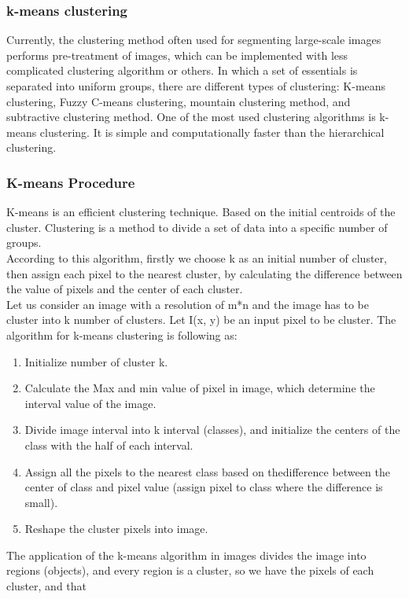 \subsubsection{k-means clustering}
Currently, the clustering method often used for segmenting large-scale images
performs pre-treatment of images, which can be implemented with less complicated
clustering algorithm or others. In which a set of essentials is separated into uniform
groups, there are different types of clustering: K-means clustering, Fuzzy C-means
clustering, mountain clustering method, and subtractive clustering method. One of
the most used clustering algorithms is k-means clustering. It is simple and
computationally faster than the hierarchical clustering.
\subsubsection*{K-means Procedure}
K-means is an efficient clustering technique. Based on the initial centroids of the
cluster. Clustering is a method to divide a set of data into a specific number of
groups.\\
According to this algorithm, firstly we choose k as an initial number of cluster, then
assign each pixel to the nearest cluster, by calculating the difference between the
value of pixels and the center of each cluster.\\
Let us consider an image with a resolution of m*n and the image has to be cluster
into k number of clusters. Let I(x, y) be an input pixel to be cluster. The algorithm for
k-means clustering is following as:
\begin{enumerate}
    \item Initialize number of cluster k.
    \item Calculate the Max and min value of pixel in image, which determine the
    interval value of the image.
    \item Divide image interval into k interval (classes), and initialize the centers of the
    class with the half of each interval.
    \item Assign all the pixels to the nearest class based on thedifference between the
    center of class and pixel value (assign pixel to class where the difference is
    small).
    \item Reshape the cluster pixels into image.
\end{enumerate}
The application of the k-means algorithm in images divides the image into regions
(objects), and every region is a cluster, so we have the pixels of each cluster, and that
